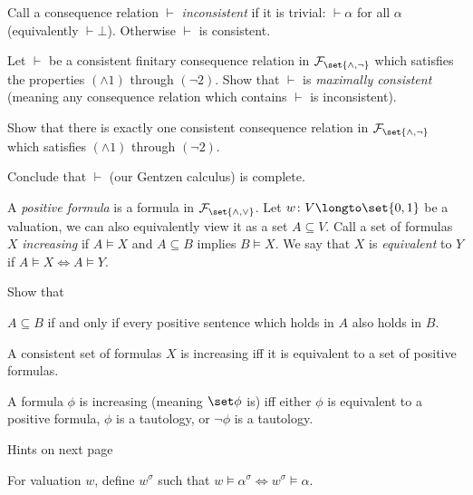     Call a consequence relation $\vdash$ {\it inconsistent} if it is trivial: $\vdash\alpha$ for
    all $\alpha$ (equivalently $\vdash\bot$).
    Otherwise $\vdash$ is consistent.

    \benum
        \item Let $\vdash$ be a consistent finitary consequence relation in
        ${\cal F}_{\set{{\land},{\neg}}}$ which satisfies the properties $(\land1)$ through
        $(\neg2)$.
        Show that $\vdash$ is {\it maximally consistent} (meaning any consequence relation which
        contains $\vdash$ is inconsistent).
        \item Show that there is exactly one consistent consequence relation in
        ${\cal F}_{\set{{\land},{\neg}}}$ which satisfies $(\land1)$ through $(\neg2)$.
        \item Conclude that $\vdash$ (our Gentzen calculus) is complete.
    \eenum

\eprob

\bprob

    A {\it positive formula} is a formula in ${\cal F}_{\set{{\land},{\lor}}}$.
    Let $w\colon V\longto\set{0,1}$ be a valuation, we can also equivalently view it as a set
    $A\subseteq V$.
    Call a set of formulas $X$ {\it increasing} if $A\vDash X$ and $A\subseteq B$ implies
    $B\vDash X$.
    We say that $X$ is {\it equivalent} to $Y$ if $A\vDash X\iff A\vDash Y$.

    Show that
    \benum
        \item $A\subseteq B$ if and only if every positive sentence which holds in $A$ also holds
        in $B$.
        \item A consistent set of formulas $X$ is increasing iff it is equivalent to a set of
        positive formulas.
        \item A formula $\phi$ is increasing (meaning $\set\phi$ is) iff either $\phi$ is
        equivalent to a positive formula, $\phi$ is a tautology, or $\neg\phi$ is a tautology.
    \eenum

\eprob

\vfill
\centerline{Hints on next page}

\break

\setcounter{math counter}{2}

\bhint

    For valuation $w$, define $w^\sigma$ such that
    $w\vDash\alpha^\sigma\iff w^\sigma\vDash\alpha$.

\ehint

\bhint

